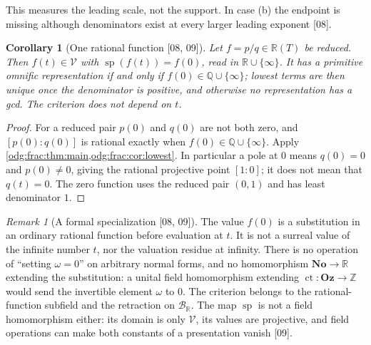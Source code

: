 \documentclass[11pt,oneside]{article}
\numberwithin{equation}{section}
\newtheorem{corollary}[corollary]{Corollary}
\theoremstyle{definition}
\theoremstyle{remark}
\newtheorem{remark}[remark]{Remark}
\newcommand{\No}{\mathbf{No}}
\newcommand{\Oz}{\mathbf{Oz}}
\newcommand{\Z}{\mathbb Z}
\newcommand{\Q}{\mathbb Q}
\newcommand{\R}{\mathbb R}
\newcommand{\BR}{\mathcal B_{\R}}
\newcommand{\ct}{\operatorname{ct}}
\newcommand{\src}[1]{\textup{\textsf{\small[#1]}}}
\newcommand{\spz}{\operatorname{sp}}
\newcommand{\Vreg}{\mathcal V}
\begin{document}
This measures the leading scale, not the support. In case (b) the endpoint is
missing although denominators exist at every larger leading exponent \src{08}.

\begin{corollary}[One rational function \src{08, 09}]\label{odg:frac:cor:onefunction}
Let $f=p/q\in\R(T)$ be reduced. Then $f(t)\in\Vreg$ with $\spz(f(t))=f(0)$, read
in $\R\cup\{\infty\}$. It has a primitive omnific representation if and only if
$f(0)\in\Q\cup\{\infty\}$; lowest terms are then unique once the denominator is
positive, and otherwise no representation has a gcd. The criterion does not
depend on $t$.
\end{corollary}
\begin{proof}
For a reduced pair $p(0)$ and $q(0)$ are not both zero, and $[p(0):q(0)]$ is
rational exactly when $f(0)\in\Q\cup\{\infty\}$. Apply
\cref{odg:frac:thm:main,odg:frac:cor:lowest}. In particular a pole at $0$
means $q(0)=0$ and $p(0)\ne0$, giving the rational projective point
$[1:0]$; it does not mean that $q(t)=0$. The zero function uses the
reduced pair $(0,1)$ and has least denominator $1$.
\end{proof}

\begin{remark}[A formal specialization \src{08, 09}]\label{odg:frac:rem:formal}
The value $f(0)$ is a substitution in an ordinary rational function before
evaluation at $t$. It is not a surreal value of the infinite number $t$, nor
the valuation residue at infinity. There is no operation of ``setting
$\omega=0$'' on arbitrary normal forms, and no homomorphism $\No\to\R$
extending the substitution: a unital field homomorphism extending
$\ct:\Oz\to\Z$ would send the invertible element $\omega$ to $0$. The
criterion belongs to the rational-function subfield and the retraction on $\BR$.
The map $\spz$ is not a field homomorphism either: its domain is only $\Vreg$,
its values are projective, and field operations can make both constants of a
presentation vanish \src{09}.
\end{remark}
\end{document}
